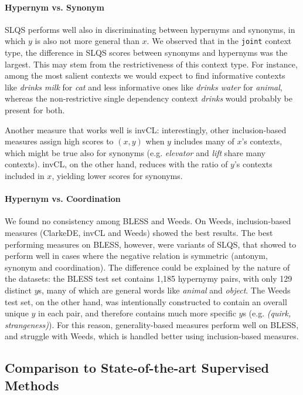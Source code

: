 \documentclass[11pt]{article}
\newcommand\smalltt[1]{\texttt{\small #1}}
\begin{document}
\paragraph{Hypernym vs. Synonym} SLQS performs well also in discriminating between hypernyms and synonyms, in which $y$ is also not more general than $x$. 
We observed that in the \smalltt{joint} context type, the difference in SLQS scores between synonyms and hypernyms was the largest.
This may stem from the restrictiveness of this context type. For instance, among the most salient contexts we would expect to find informative contexts like \emph{drinks milk} for \emph{cat} and less informative ones like \emph{drinks water} for \emph{animal}, whereas the non-restrictive single dependency context \emph{drinks} would probably be present for both. 

Another measure that works well is invCL: interestingly, other inclusion-based measures assign high scores to $(x,y)$ when $y$ includes many of $x$'s contexts, which might be true also for synonyms (e.g. \emph{elevator} and \emph{lift} share many contexts). invCL, on the other hand, reduces with the ratio of $y$'s contexts included in $x$, yielding lower scores for synonyms.

\paragraph{Hypernym vs. Coordination} We found no consistency among BLESS and Weeds. On Weeds, inclusion-based measures (ClarkeDE, invCL and Weeds) showed the best results. The best performing measures on BLESS, however, were variants of SLQS, that showed to perform well in cases where the negative relation is symmetric (antonym, synonym and coordination). The difference could be explained by the nature of the datasets: the BLESS test set contains 1,185 hypernymy pairs, with only 129 distinct $y$s, many of which are general words like \emph{animal} and \emph{object}. The Weeds test set, on the other hand, was intentionally constructed to contain an overall unique $y$ in each pair, and therefore contains much more specific $y$s (e.g. \emph{(quirk, strangeness)}). For this reason, generality-based measures perform well on BLESS, and struggle with Weeds, which is handled better using inclusion-based measures.


\subsection{Comparison to State-of-the-art Supervised Methods}
\label{sec:embeddings}
\end{document}
